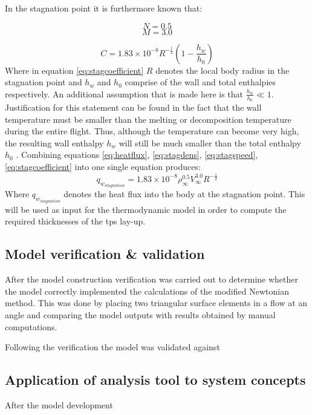 In the stagnation point it is furthermore known that: 
\begin{multicols}{2}
\begin{equation}
\label{eq:stagdens}
N=0.5
\end{equation} \break
\begin{equation}
\label{eq:stagspeed}
M=3.0
\end{equation}
\end{multicols}
\begin{equation}
\label{eq:stagcoefficient}
C=1.83 \times 10^{-8} R^{-\frac{1}{2}}\left(1-\frac{h_{w}}{h_{0}}\right)
\end{equation}
Where in equation \ref{eq:stagcoefficient} $R$ denotes the local body radius in the stagnation point and $h_{w}$ and $h_{0}$ comprise of the wall and total enthalpies respectively. An additional assumption that is made here is that $\frac{h_{w}}{h_{0}}\ll 1$. Justification for this statement can be found in the fact that the wall temperature must be smaller than the melting or decomposition temperature during the entire flight. Thus, although the temperature can become very high, the resulting wall enthalpy $h_{w}$ will still be much smaller than the total enthalpy $h_{0}$ \cite[p.347]{AndersonJr.2006}. %
Combining equations \ref{eq:heatflux}, \ref{eq:stagdens}, \ref{eq:stagspeed}, \ref{eq:stagcoefficient} into one single equation produces:
\begin{equation}
q_{w_{stagnation}}=1.83 \times 10^{-8}\rho_{\infty}^{0.5} V_{\infty}^{3.0} R^{-\frac{1}{2}}
\label{eq:qstag}
\end{equation}
Where $q_{w_{stagnation}}$ denotes the heat flux into the body at the stagnation point. This will be used as input for the thermodynamic model in order to compute the required thicknesses of the \acrfull{tps} lay-up.

\subsection{Model verification \& validation}
\label{subsec:aeroverval}
After the model construction verification was carried out to determine whether the model correctly implemented the calculations of the modified Newtonian method. This was done by placing two triangular surface elements in a flow at an angle and comparing the model outputs with results obtained by manual computations. 

Following the verification the model was validated against \cite[p. 783]{AndersonJr.2007}

\subsection{Application of analysis tool to system concepts}
\label{subsec:appaeroanal}
After the model development 
